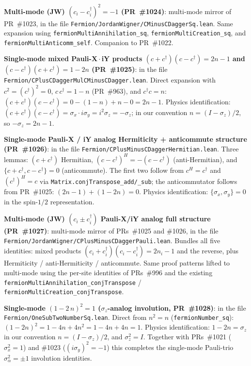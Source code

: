 \documentclass[a4paper,11pt]{article}
\begin{document}
\textbf{Multi-mode (JW) $(c_i - c_i^\dagger)^2 = -1$
(PR~\#1024)}: multi-mode mirror of PR~\#1023, in the file
\texttt{Fermion/JordanWigner/CMinusCDaggerSq.lean}. Same
expansion using \texttt{fermionMultiAnnihilation\_sq},
\texttt{fermionMultiCreation\_sq}, and
\texttt{fermionMultiAnticomm\_self}. Companion to PR~\#1022.

\textbf{Single-mode mixed Pauli-X\,$\cdot$\,iY products
$(c + c^\dagger)(c - c^\dagger) = 2n - 1$ and
$(c - c^\dagger)(c + c^\dagger) = 1 - 2n$ (PR~\#1025)}: in the
file \texttt{Fermion/CPlusCDaggerMulCMinusCDagger.lean}.
Direct expansion with $c^2 = (c^\dagger)^2 = 0$,
$c\,c^\dagger = 1 - n$ (PR~\#963), and $c^\dagger c = n$:
$(c + c^\dagger)(c - c^\dagger) = 0 - (1 - n) + n - 0 =
2n - 1$. Physics identification:
$(c + c^\dagger)(c - c^\dagger) = \sigma_x \cdot i\sigma_y =
i^2 \sigma_z = -\sigma_z$; in our convention
$n = (I - \sigma_z)/2$, so $-\sigma_z = 2n - 1$.

\textbf{Single-mode Pauli-X / iY analog Hermiticity +
anticommute structure (PR~\#1026)}: in the file
\texttt{Fermion/CPlusMinusCDaggerHermitian.lean}. Three lemmas:
$(c + c^\dagger)$ Hermitian, $(c - c^\dagger)^H = -(c -
c^\dagger)$ (anti-Hermitian), and $\{c + c^\dagger, c -
c^\dagger\} = 0$ (anticommute). The first two follow from
$c^H = c^\dagger$ and $(c^\dagger)^H = c$ via
\texttt{Matrix.conjTranspose\_add/\_sub}; the anticommutator
follows from PR~\#1025: $(2n - 1) + (1 - 2n) = 0$. Physics
identification: $\{\sigma_x, \sigma_y\} = 0$ in the spin-$1/2$
representation.

\textbf{Multi-mode (JW) $(c_i \pm c_i^\dagger)$ Pauli-X/iY
analog full structure (PR~\#1027)}: multi-mode mirror of
PRs~\#1025 and \#1026, in the file
\texttt{Fermion/JordanWigner/CPlusMinusCDaggerPauli.lean}.
Bundles all five identities: mixed products $(c_i + c_i^\dagger)
(c_i - c_i^\dagger) = 2 n_i - 1$ and the reverse, plus
Hermiticity / anti-Hermiticity / anticommute. Same proof
patterns lifted to multi-mode using the per-site identities of
PRs~\#996 and the existing
\texttt{fermionMultiAnnihilation\_conjTranspose} /
\texttt{fermionMultiCreation\_conjTranspose}.

\textbf{Single-mode $(1 - 2\,n)^2 = 1$ ($\sigma_z$-analog
involution, PR~\#1028)}: in the file
\texttt{Fermion/OneSubTwoNumberSq.lean}. Direct from $n^2 = n$
(\texttt{fermionNumber\_sq}): $(1 - 2n)^2 = 1 - 4n + 4n^2 =
1 - 4n + 4n = 1$. Physics identification: $1 - 2n = \sigma_z$
in our convention $n = (I - \sigma_z)/2$, and $\sigma_z^2 = I$.
Together with PRs~\#1021 ($\sigma_x^2 = 1$) and \#1023
($(i\sigma_y)^2 = -1$) this completes the single-mode Pauli-trio
$\sigma_\alpha^2 = \pm 1$ involution identities.
\end{document}
